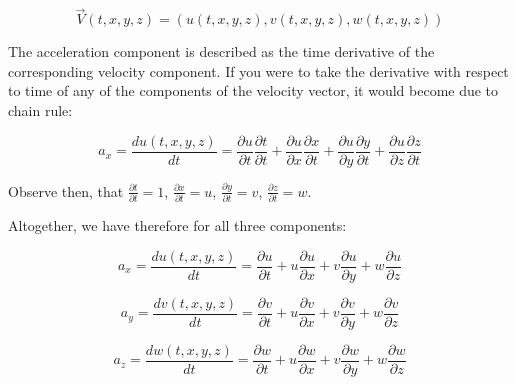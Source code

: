 \begin{equation}
\vec{V}(t, x, y, z) = (u(t, x, y, z), v(t, x, y, z), w(t, x, y, z))
\end{equation}

The acceleration component is described as the time derivative of the corresponding velocity component. If you were to take the derivative with respect to time of any of the components of the velocity vector, it would become due to chain rule:

\begin{equation}
a_x = \frac{d u(t,x,y,z)}{dt} = \frac{\partial u}{\partial t} \frac{\partial t}{\partial t} + \frac{\partial u}{\partial x} \frac{\partial x}{\partial t} + \frac{\partial u}{\partial y} \frac{\partial y}{\partial t} + \frac{\partial u}{\partial z} \frac{\partial z}{\partial t}
\end{equation}

Observe then, that $\frac{\partial t}{\partial t} = 1$, $\frac{\partial x}{\partial t} = u$, $\frac{\partial y}{\partial t} = v$, $\frac{\partial z}{\partial t} = w$.

Altogether, we have therefore for all three components:

\begin{equation}
a_x = \frac{d u(t,x,y,z)}{dt} = \frac{\partial u}{\partial t} + u \frac{\partial u}{\partial x} + v \frac{\partial u}{\partial y} + w \frac{\partial u}{\partial z}
\end{equation}

\begin{equation}
a_y = \frac{d v(t,x,y,z)}{dt} = \frac{\partial v}{\partial t} + u \frac{\partial v}{\partial x} + v \frac{\partial v}{\partial y} + w \frac{\partial v}{\partial z}
\end{equation}

\begin{equation}
a_z = \frac{d w(t,x,y,z)}{dt} = \frac{\partial w}{\partial t} + u \frac{\partial w}{\partial x} + v \frac{\partial w}{\partial y} + w \frac{\partial w}{\partial z}
\end{equation}

